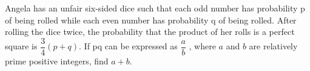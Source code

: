 Angela has an unfair six-sided dice such that each odd number has probability p of being rolled while each even number has probability q of being rolled. After rolling the dice twice, the probability that the product of her rolls is a perfect square is $\dfrac{3}{4}(p + q)$. If pq can be expressed as $\dfrac{a}{b}$ , where $a$ and $b$ are relatively prime positive integers, find $a + b$.
